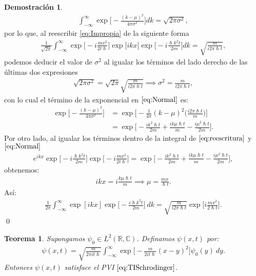 \documentclass[12pt]{article}
\newtheorem{teo}{Teorema}[section]
\theoremstyle{definition}
\newtheorem*{demo}{Demostración}
\newcommand*{\field}[1]{\mathbb{#1}}
\begin{document}
\begin{demo}
    \begin{align} \int_{-\infty}^{\infty}\exp\bigg[-\frac{(k-\mu)^2}{4\pi\sigma^2}\bigg]dk = \sqrt{2\pi\sigma^2},
    \label{eq:Normal}
    \end{align}
    por lo que, al reescribir \eqref{eq:Impropia} de la siguiente forma
    \begin{align}
        \frac{1}{\sqrt{2\pi}}\int_{-\infty}^{\infty}
        \exp\bigg[-i\frac{mx^2}{2t\hslash}\bigg]
        \exp\big[ikx\big]\exp\bigg[-i\frac{\hslash k^2t}{2m}\bigg]dk = 
        \sqrt{\frac{m}{i2\pi\hslash t}},
        \label{eq:reescritura}
    \end{align}
    podemos deducir el valor de $\sigma^2$ al igualar los términos del lado derecho de las últimas dos expresiones
    \begin{align*}
        \sqrt{2\pi\sigma^2} = \sqrt{2\pi}\sqrt{\frac{m}{i2\pi\hslash t}} \implies \sigma ^2 = \frac{m}{i 2\pi\hslash t},
    \end{align*}
    con lo cual el término de la exponencial en $\eqref{eq:Normal}$ es:
    \begin{align*} \exp\bigg[-\frac{(k-\mu)^2}{4\pi\sigma ^2}\bigg] & = \exp\bigg[-\frac{1}{4\pi}(k-\mu)^2\bigg(\frac{i 2\pi\hslash t}{m}\bigg)\bigg] \\ & = \exp\bigg[-\frac{ik^2\hslash t}{2m} + \frac{ik\mu\hslash t}{m}-\frac{i\mu^2\hslash t}{2m}\bigg].
    \end{align*}
    Por otro lado, al igualar los términos dentro de la integral de $\eqref{eq:reescritura}$ y $\eqref{eq:Normal}$
    \begin{align*}
        e^{ikx}\exp\bigg[-i\frac{\hslash k^2t}{2m}\bigg]\exp\bigg[-i\frac{mx^2}{2t\hslash}\bigg] = \exp\bigg[-\frac{ik^2\hslash t}{2m} + \frac{ik\mu\hslash t}{m}-\frac{i\mu^2\hslash t}{2m}\bigg],
    \end{align*}
    obtenemos:
    \begin{align*}
        ikx = i\frac{k\mu\hslash t}{m} \implies 
        \mu = \frac{mx}{\hslash t}.
    \end{align*}
    Así:
    \begin{align*}
        \frac{1}{2\pi}\int_{-\infty}^{\infty}\exp[ikx]\exp\bigg[-\frac{i\hslash k^2 t}{2m}\bigg] \: dk = \sqrt{\frac{m}{i2\pi\hslash t}} \exp\bigg[i\frac{mx^2}{2\hslash t}\bigg].
    \end{align*}
    \qed
\end{demo}
\begin{teo}
    Supongamos $\psi_{0} \in L^2(\field{R},\field{C})$. Definamos $\psi(x,t)$ por:
    \begin{align*}
        \psi(x,t) = \sqrt{\frac{m}{2\pi it\hslash}}\int_{-\infty}^{\infty}\exp\bigg[-\frac{m}{2it\hslash}(x-y)^2\bigg]\psi_{0}(y) \: dy.
    \end{align*}
    Entonces $\psi(x,t)$ satisface el PVI $\eqref{eq:TISchrodinger}$.
    \label{teo:Rev4}
\end{teo}
\end{document}
